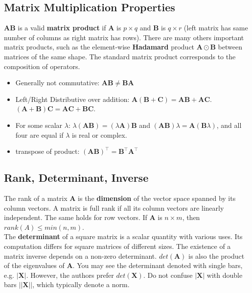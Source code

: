 \documentclass{harvardml}
\theoremstyle{definition}
\theoremstyle{plain}
\renewcommand{\v}[1]{\mathbf{#1}}
\begin{document}
    \subsection{Matrix Multiplication Properties}
			$\mathbf{A}\mathbf{B}$ is a valid \textbf{matrix product}
			if $\mathbf{A}$ is $p \times q$ and $\mathbf{B}$ is $q \times r$
			(left matrix has same number of columns as right matrix has rows).
				  There are many others important matrix products,
				  such as the element-wise \textbf{Hadamard} product
				  $\mathbf{A} \odot \mathbf{B}$ between matrices of the same
				  shape. The standard matrix product corresponds to the 
				  composition of operators.
			\begin{itemize}
				\item Generally not commutative: 
					  $\mathbf{A}\mathbf{B} \neq \mathbf{B}\mathbf{A}$
            	\item Left/Right Distributive over addition:
					  $\mathbf{A}(\mathbf{B} + \mathbf{C}) = 
					  \mathbf{AB} + \mathbf{AC}$.
				  	  $(\mathbf{A} + \mathbf{B})\mathbf{C} = 
					  \mathbf{AC} + \mathbf{BC}$.
				\item For some scalar $\lambda$:
					$ \lambda(\mathbf{AB}) = 
					(\lambda\mathbf{A})\mathbf{B} $ and
					$ (\mathbf{AB})\lambda = \mathbf{A}
					(\mathbf{B}\lambda) $, 
                    and all four are equal if 
					$\lambda$ is real or complex.
				\item transpose of product:
					   $(\mathbf{AB})^\top = 
						\mathbf{B}^\top\mathbf{A}^\top$ 
			\end{itemize}

    
    \subsection{Rank, Determinant, Inverse}
		
		The rank of a matrix $\mathbf{A}$ is the \textbf{dimension} 
        of the vector space spanned by its column vectors. A matrix 
    	is full rank if all its column vectors are linearly independent. 
        The same holds for row vectors. If $\mathbf{A}$ is $n \times m$, 
        then $rank(A) \leq min(n,m)$.\\

		\noindent The \textbf{determinant} of a square matrix is a 
		scalar quantity with various uses. Its computation differs 
		for square matrices of different sizes. The existence of a 
		matrix inverse depends on a non-zero determinant. 
		$det(\mathbf{A})$ is also the product 
        of the eigenvalues of $\mathbf{A}$. You may see the determinant
        denoted with single bars, e.g. $|\v X |$. However, the
		authors prefer $det(\v X)$. 
		Do not confuse $| \v X|$ with double bars 
		$||\v X||$, which typically denote a norm.\\
		
\end{document}

